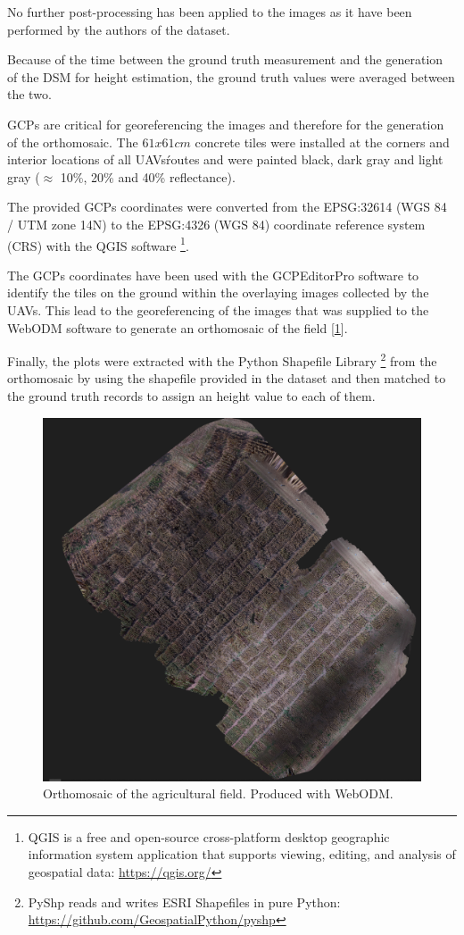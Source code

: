 No further post-processing has been applied to the images as it have been performed by the authors of the dataset.

Because of the time between the ground truth measurement and the generation of the DSM for height estimation, the ground truth values were averaged between the two.

GCPs are critical for georeferencing the images and therefore for the generation of the orthomosaic. The $61x61cm$ concrete tiles were installed at the corners and interior locations of all UAVs\' routes and were painted black, dark gray and light gray ($\approx$ 10\%, 20\% and 40\% reflectance).

The provided GCPs coordinates were converted from the EPSG:32614 (WGS 84 / UTM zone 14N) to the EPSG:4326 (WGS 84) coordinate reference system (CRS) with the QGIS software \footnote{QGIS is a free and open-source cross-platform desktop geographic information system application that supports viewing, editing, and analysis of geospatial data: \url{https://qgis.org/}}.

The GCPs coordinates have been used with the GCPEditorPro software to identify the tiles on the ground within the overlaying images collected by the UAVs.
This lead to the georeferencing of the images that was supplied to the WebODM software to generate an orthomosaic of the field [\ref{fig:orthomosaic}].

Finally, the plots were extracted with the Python Shapefile Library \footnote{PyShp reads and writes ESRI Shapefiles in pure Python: \url{https://github.com/GeospatialPython/pyshp}} from the orthomosaic by using the shapefile provided in the dataset and then matched to the ground truth records to assign an height value to each of them.

\begin{figure}[b!]
    \includegraphics[width=\linewidth]{../images/orthomosaic} 
    \caption{Orthomosaic of the agricultural field. Produced with WebODM.}
    \label{fig:orthomosaic}
\end{figure}